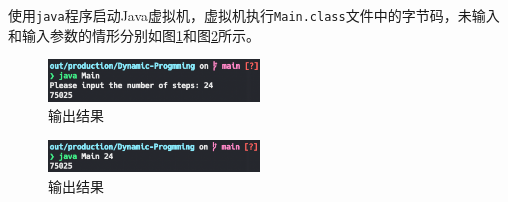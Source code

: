 \documentclass[11pt]{homework}
\begin{document}
使用\verb|java|程序启动Java虚拟机，虚拟机执行\verb|Main.class|文件中的字节码，未输入和输入参数的情形分别如图\ref{q3_output_2}和图\ref{q3_output_3}所示。
\begin{figure}
  \centering
  \includegraphics[width=0.5\textwidth]{q3_output_2}
  \caption{输出结果}
  \label{q3_output_2}
\end{figure}
\begin{figure}
  \centering
  \includegraphics[width=0.5\textwidth]{q3_output_3}
  \caption{输出结果}
  \label{q3_output_3}
\end{figure}
\end{document}
